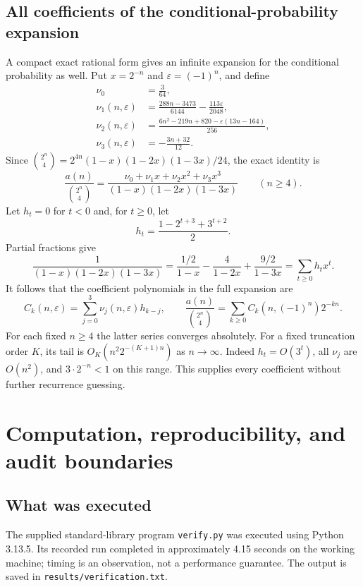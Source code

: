 \documentclass[11pt,letterpaper]{article}
\theoremstyle{definition}
\newcommand{\1}{\mathbf 1}
\begin{document}
\subsection{All coefficients of the conditional-probability expansion}
A compact exact rational form gives an infinite expansion for the conditional
probability as well. Put $x=2^{-n}$ and $\varepsilon=(-1)^n$, and define
\begin{align*}
 \nu_0&=\frac3{64},\\
 \nu_1(n,\varepsilon)&=\frac{288n-3473}{6144}
                         -\frac{113\varepsilon}{2048},\\
 \nu_2(n,\varepsilon)&=\frac{6n^2-219n+820-\varepsilon(13n-164)}{256},\\
 \nu_3(n,\varepsilon)&=-\frac{3n+32}{12}.
\end{align*}
Since $\binom{2^n}{4}=2^{4n}(1-x)(1-2x)(1-3x)/24$, the exact identity is
\begin{equation}\label{eq:probrational}
 \frac{a(n)}{\binom{2^n}{4}}
 =\frac{\nu_0+\nu_1x+\nu_2x^2+\nu_3x^3}{(1-x)(1-2x)(1-3x)}
 \qquad(n\ge4).
\end{equation}
Let $h_t=0$ for $t<0$ and, for $t\ge0$, let
\begin{equation}\label{eq:hcoef}
 h_t=\frac{1-2^{t+3}+3^{t+2}}2.
\end{equation}
Partial fractions give
\[
 \frac1{(1-x)(1-2x)(1-3x)}
 =\frac{1/2}{1-x}-\frac4{1-2x}+\frac{9/2}{1-3x}
 =\sum_{t\ge0}h_tx^t.
\]
It follows that the coefficient polynomials in the full expansion are
\begin{equation}\label{eq:allcoeffs}
 C_k(n,\varepsilon)=\sum_{j=0}^3\nu_j(n,\varepsilon)h_{k-j},
 \qquad
 \frac{a(n)}{\binom{2^n}{4}}
 =\sum_{k\ge0}C_k(n,(-1)^n)2^{-kn}.
\end{equation}
For each fixed $n\ge4$ the latter series converges absolutely. For a fixed
truncation order $K$, its tail is $O_K(n^2 2^{-(K+1)n})$ as $n\to\infty$.
Indeed $h_t=O(3^t)$, all $\nu_j$ are $O(n^2)$, and $3\cdot2^{-n}<1$ on this
range. This supplies every coefficient without further recurrence guessing.

\section{Computation, reproducibility, and audit boundaries}
\label{sec:computation}

\subsection{What was executed}
The supplied standard-library program \texttt{verify.py} was executed using
Python 3.13.5. Its recorded run completed in approximately 4.15 seconds on the
working machine; timing is an observation, not a performance guarantee.
The output is saved in \texttt{results/verification.txt}.
\end{document}
